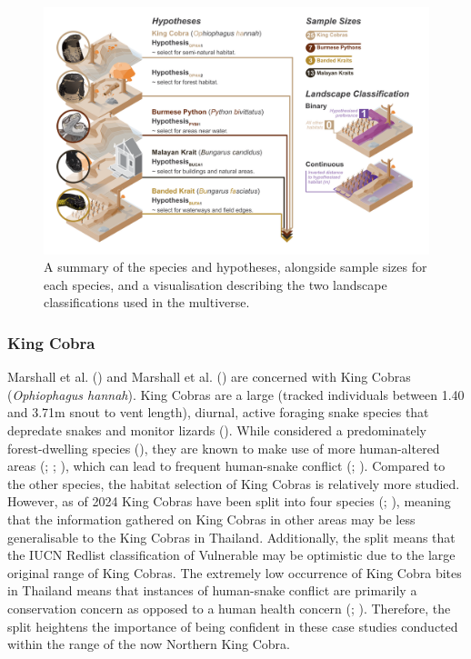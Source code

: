 \documentclass[10pt,a4paper]{article}
\begin{document}
\begin{figure}
\includegraphics[width=1\linewidth]{../ext_images/hypothesis_visual} \caption{A summary of the species and hypotheses, alongside sample sizes for each species, and a visualisation describing the two landscape classifications used in the multiverse.}\label{fig:hypothesesFigure}
\end{figure}

\subsubsection{King Cobra}\label{king-cobra}

Marshall et al. () and Marshall et al. () are concerned with King Cobras (\emph{Ophiophagus hannah}).
King Cobras are a large (tracked individuals between 1.40 and 3.71m snout to vent length), diurnal, active foraging snake species that depredate snakes and monitor lizards ().
While considered a predominately forest-dwelling species (), they are known to make use of more human-altered areas (; ; ), which can lead to frequent human-snake conflict (; ).
Compared to the other species, the habitat selection of King Cobras is relatively more studied.
However, as of 2024 King Cobras have been split into four species (; ), meaning that the information gathered on King Cobras in other areas may be less generalisable to the King Cobras in Thailand.
Additionally, the split means that the IUCN Redlist classification of Vulnerable may be optimistic due to the large original range of King Cobras.
The extremely low occurrence of King Cobra bites in Thailand means that instances of human-snake conflict are primarily a conservation concern as opposed to a human health concern (; ).
Therefore, the split heightens the importance of being confident in these case studies conducted within the range of the now Northern King Cobra.
\end{document}
